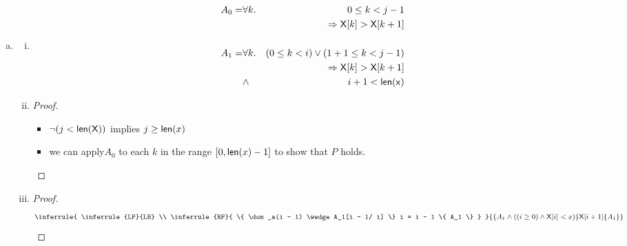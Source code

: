 \begin{enumerate}[(a)]
\item
\begin{enumerate}[i.]
    \item
    \begin{eqnarray*}
        A_0 = & \forall k . & 0 \leq k < j - 1 \\
              &             & \Rightarrow  {\sf X}[k] > {\sf X}[k + 1] \\
              & & \\
        A_1 = & \forall k.  & (0 \leq k < i) \vee (1 + 1 \leq k < j - 1) \\
              &             & \Rightarrow {\sf X}[k] > {\sf X}[k + 1] \\
              &    \wedge   & i + 1 < {\sf len(x)} \\
    \end{eqnarray*}

    \item
    \begin{proof} \hspace{1cm} \\
        \begin{itemize}
        \item $\neg (j < {\sf len(X)})$ implies $j \geq {\sf len}(x)$
        \item we can apply$A_0$ to each $k$ in the range
        $[0, {\sf len}(x) - 1]$ to show that $P$ holds.
        \end{itemize}
    \end{proof}

    \item
    \begin{proof}
        \newcommand{\leftPremise}{LP}
        \newcommand{\leftBase}{LB}
        \newcommand{\rightPremise}{RP}
        \newcommand{\rightBase}{
            \{ \dom_a(i - 1) \wedge A_1[i - 1/ i] \}
            i = i - 1
            \{ A_1 \}
        }
        \newcommand{\treeBase}{
            \{ A_1 \wedge ((i \geq 0) \wedge {\sf X}[i] < x) \}
            {\sf X}[i + 1]
            \{ A_1 \}
        }
        $$ \inferrule{
                \inferrule{\leftPremise}{\leftBase}
                \\
                \inferrule{\rightPremise}{\rightBase}
            }{\treeBase}
        $$
    \end{proof}
    \end{enumerate}


\end{enumerate}
